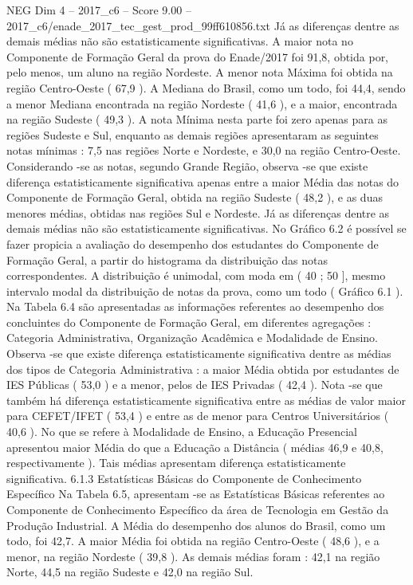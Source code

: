 \begin{textsample}{NEG Dim 4 – 2017\_c6 – Score 9.00 – 2017\_c6/enade\_2017\_tec\_gest\_prod\_99ff610856.txt}
Já as diferenças dentre as demais médias não são estatisticamente significativas.
A maior nota no Componente de Formação Geral da prova do Enade/2017 foi 91,8, obtida por, pelo menos, um aluno na região Nordeste.
A menor nota Máxima foi obtida na região Centro-Oeste ( 67,9 ).
A Mediana do Brasil, como um todo, foi 44,4, sendo a menor Mediana encontrada na região Nordeste ( 41,6 ), e a maior, encontrada na região Sudeste ( 49,3 ).
A nota Mínima nesta parte foi zero apenas para as regiões Sudeste e Sul, enquanto as demais regiões apresentaram as seguintes notas mínimas : 7,5 nas regiões Norte e Nordeste, e 30,0 na região Centro-Oeste.
Considerando -se as notas, segundo Grande Região, observa -se que existe diferença estatisticamente significativa apenas entre a maior Média das notas do Componente de Formação Geral, obtida na região Sudeste ( 48,2 ), e as duas menores médias, obtidas nas regiões Sul e Nordeste.
Já as diferenças dentre as demais médias não são estatisticamente significativas.
No Gráfico 6.2 é possível se fazer propicia a avaliação do desempenho dos estudantes do Componente de Formação Geral, a partir do histograma da distribuição das notas correspondentes.
A distribuição é unimodal, com moda em ( 40 ; 50 ], mesmo intervalo modal da distribuição de notas da prova, como um todo ( Gráfico 6.1 ).
Na Tabela 6.4 são apresentadas as informações referentes ao desempenho dos concluintes do Componente de Formação Geral, em diferentes agregações : Categoria Administrativa, Organização Acadêmica e Modalidade de Ensino.
Observa -se que existe diferença estatisticamente significativa dentre as médias dos tipos de Categoria Administrativa : a maior Média obtida por estudantes de IES Públicas ( 53,0 ) e a menor, pelos de IES Privadas ( 42,4 ).
Nota -se que também há diferença estatisticamente significativa entre as médias de valor maior para CEFET/IFET ( 53,4 ) e entre as de menor para Centros Universitários ( 40,6 ).
No que se refere à Modalidade de Ensino, a Educação Presencial apresentou maior Média do que a Educação a Distância ( médias 46,9 e 40,8, respectivamente ).
Tais médias apresentam diferença estatisticamente significativa. 6.1.3 Estatísticas Básicas do Componente de Conhecimento Específico Na Tabela 6.5, apresentam -se as Estatísticas Básicas referentes ao Componente de Conhecimento Específico da área de Tecnologia em Gestão da Produção Industrial.
A Média do desempenho dos alunos do Brasil, como um todo, foi 42,7.
A maior Média foi obtida na região Centro-Oeste ( 48,6 ), e a menor, na região Nordeste ( 39,8 ).
As demais médias foram : 42,1 na região Norte, 44,5 na região Sudeste e 42,0 na região Sul.

\end{textsample}
